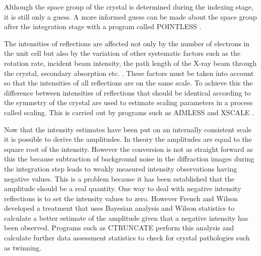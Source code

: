         Although the space group of the crystal is determined during the indexing stage, it is still only a guess.
        A more informed guess can be made about the space group after the integration stage with a program called POINTLESS \cite{evans2011introduction}.

        The intensities of reflections are affected not only by the number of electrons in the unit cell but also by the variation of other systematic factors such as the rotation rate, incident beam intensity, the path length of the X-ray beam through the crystal, secondary absorption etc. \cite{evans2005}.
        These factors must be taken into account so that the intensities of all reflections are on the same scale. To achieve this the difference between intensities of reflections that should be identical according to the symmetry of the crystal are used to estimate scaling parameters in a process called scaling.
        This is carried out by programs such as AIMLESS \cite{evans2013} and XSCALE \cite{kabsch2010}.

        Now that the intensity estimates have been put on an internally consistent scale it is possible to derive the amplitudes.
        In theory the amplitudes are equal to the square root of the intensity.
        However the conversion is not as straight forward as this the because subtraction of background noise in the diffraction images during the integration step leads to weakly measured intensity observations having negative values.
        This is a problem because it has been established that the amplitude should be a real quantity.
        One way to deal with negative intensity reflections is to set the intensity values to zero.
        However French and Wilson developed a treatment that uses Bayesian analysis \cite{french1978treatment} and Wilson statistics \cite{wilson1949probability} to calculate a better estimate of the amplitude given that a negative intensity has been observed.
        Programs such as CTRUNCATE \cite{evans2011introduction} perform this analysis and calculate further data assessment statistics to check for crystal pathologies such as twinning.

